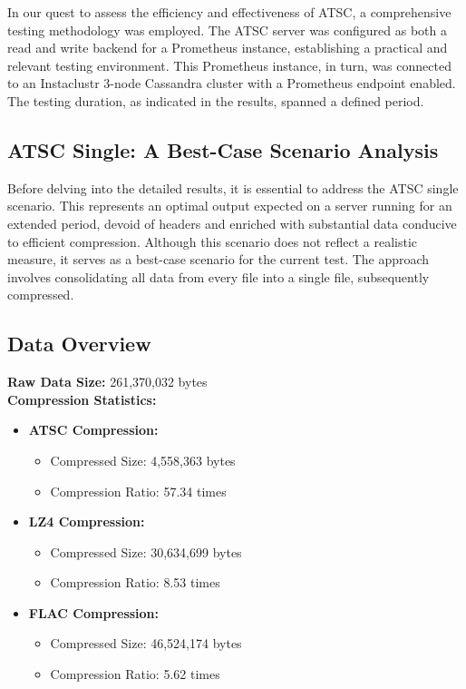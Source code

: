 \documentclass[conference]{IEEEtran}
\begin{document}
In our quest to assess the efficiency and effectiveness of ATSC, a comprehensive testing methodology was employed. The ATSC server was configured as both a read and write backend for a Prometheus instance, establishing a practical and relevant testing environment. This Prometheus instance, in turn, was connected to an Instaclustr 3-node Cassandra cluster with a Prometheus endpoint enabled. The testing duration, as indicated in the results, spanned a defined period.

\subsection*{ATSC Single: A Best-Case Scenario Analysis}

Before delving into the detailed results, it is essential to address the ATSC single scenario. This represents an optimal output expected on a server running for an extended period, devoid of headers and enriched with substantial data conducive to efficient compression. Although this scenario does not reflect a realistic measure, it serves as a best-case scenario for the current test. The approach involves consolidating all data from every file into a single file, subsequently compressed.

\subsection*{Data Overview}

\textbf{Raw Data Size:} 261,370,032 bytes \\
\textbf{Compression Statistics:}

\begin{itemize}
    \item \textbf{ATSC Compression:}
    \begin{itemize}
        \item Compressed Size: 4,558,363 bytes
        \item Compression Ratio: 57.34 times
    \end{itemize}
    \item \textbf{LZ4 Compression:}
    \begin{itemize}
        \item Compressed Size: 30,634,699 bytes
        \item Compression Ratio: 8.53 times
    \end{itemize}
    \item \textbf{FLAC Compression:}
    \begin{itemize}
        \item Compressed Size: 46,524,174 bytes
        \item Compression Ratio: 5.62 times
    \end{itemize}
\end{itemize}
\end{document}
